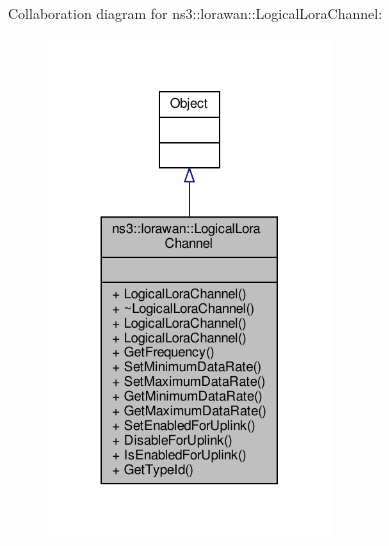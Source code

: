 Collaboration diagram for ns3\+:\+:lorawan\+:\+:Logical\+Lora\+Channel\+:
\nopagebreak
\begin{figure}[H]
\begin{center}
\leavevmode
\includegraphics[width=212pt]{classns3_1_1lorawan_1_1LogicalLoraChannel__coll__graph}
\end{center}
\end{figure}
